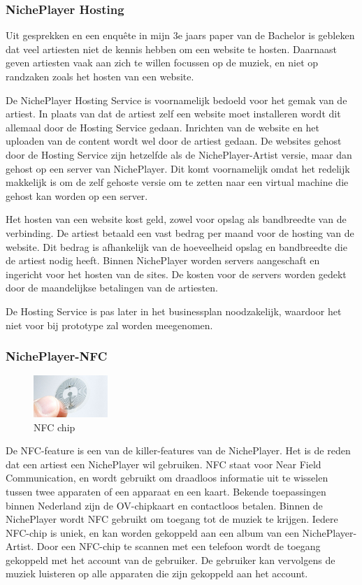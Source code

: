 \subsubsection*{NichePlayer Hosting}
Uit gesprekken en een enquête in mijn 3e jaars paper van de Bachelor is gebleken dat veel artiesten niet de kennis hebben om een website te hosten. Daarnaast geven artiesten vaak aan zich te willen focussen op de muziek, en niet op randzaken zoals het hosten van een website.

De NichePlayer Hosting Service is voornamelijk bedoeld voor het gemak van de artiest. In plaats van dat de artiest zelf een website moet installeren wordt dit allemaal door de Hosting Service gedaan. Inrichten van de website en het uploaden van de content wordt wel door de artiest gedaan. De websites gehost door de Hosting Service zijn hetzelfde als de NichePlayer-Artist versie, maar dan gehost op een server van NichePlayer. Dit komt voornamelijk omdat het redelijk makkelijk is om de zelf gehoste versie om te zetten naar een virtual machine die gehost kan worden op een server.

Het hosten van een website kost geld, zowel voor opslag als bandbreedte van de verbinding. De artiest betaald een vast bedrag per maand voor de hosting van de website. Dit bedrag is afhankelijk van de hoeveelheid opslag en bandbreedte die de artiest nodig heeft. Binnen NichePlayer worden servers aangeschaft en ingericht voor het hosten van de sites. De kosten voor de servers worden gedekt door de maandelijkse betalingen van de artiesten.

De Hosting Service is pas later in het businessplan noodzakelijk, waardoor het niet voor bij prototype zal worden meegenomen.

\subsubsection*{NichePlayer-NFC}
\begin{figure}
  \centering
  \includegraphics[width=0.25\textwidth]{assets/uitvoering/NFC_chips.jpg}
  \caption{NFC chip}
  \label{fig:uitvoering:NFC_chip}
\end{figure}
De NFC-feature is een van de killer-features van de NichePlayer. Het is de reden dat een artiest een NichePlayer wil gebruiken. NFC staat voor Near Field Communication, en wordt gebruikt om draadloos informatie uit te wisselen tussen twee apparaten of een apparaat en een kaart. Bekende toepassingen binnen Nederland zijn de OV-chipkaart en contactloos betalen. Binnen de NichePlayer wordt NFC gebruikt om toegang tot de muziek te krijgen. Iedere NFC-chip is uniek, en kan worden gekoppeld aan een album van een NichePlayer-Artist. Door een NFC-chip te scannen met een telefoon wordt de toegang gekoppeld met het account van de gebruiker. De gebruiker kan vervolgens de muziek luisteren op alle apparaten die zijn gekoppeld aan het account.


